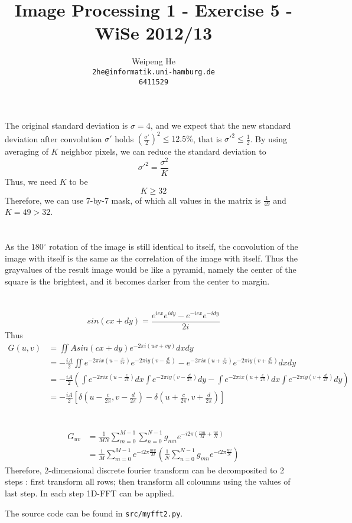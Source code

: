 \documentclass[a4paper,11pt]{article}
\title{Image Processing 1 - Exercise 5 - WiSe 2012/13}
\author{Weipeng He \\ \texttt{2he@informatik.uni-hamburg.de} \\ \texttt{6411529}}
\begin{document}
\maketitle

\section{}
The original standard deviation is $\sigma = 4$, and we expect that the new standard deviation after convolution $\sigma'$ holds $ (\frac{\sigma'}{2})^2 \le 12.5\% $, that is $ \sigma'^2 \le \frac{1}{2} $. By using averaging of $K$ neighbor pixels, we can reduce the standard deviation to
\[ \sigma'^2 = \frac{\sigma^2}{K} \]
Thus, we need $K$ to be
\[ K \ge 32 \]
Therefore, we can use 7-by-7 mask, of which all values in the matrix is $\frac{1}{49}$ and $K = 49 > 32$.

\section{}
As the $180^\circ$ rotation of the image is still identical to itself, the convolution of the image with itself is the same as the correlation of the image with itself. Thus the grayvalues of the result image would be like a pyramid, namely the center of the square is the brightest, and it becomes darker from the center to margin.

\section{}
\[ sin(cx + dy) = \frac{e^{icx}e^{idy}-e^{-icx}e^{-idy}}{2i} \]
Thus
\begin{align*}
  G(u,v) &= \iint A sin(cx+dy) e^{-2\pi i(ux+vy)}dxdy \\
         &= -\frac{iA}{2}\iint e^{-2\pi ix(u-\frac{c}{2\pi})}e^{-2\pi iy(v-\frac{d}{2\pi})}
            - e^{-2\pi ix(u+\frac{c}{2\pi})}e^{-2\pi iy(v+\frac{d}{2\pi})} dxdy \\
         &= -\frac{iA}{2} (\int e^{-2\pi ix(u-\frac{c}{2\pi})}dx \int e^{-2\pi iy(v-\frac{d}{2\pi})} dy - \int e^{-2\pi ix(u+\frac{c}{2\pi})} dx \int e^{-2\pi iy(v+\frac{d}{2\pi})}dy) \\
         &= -\frac{iA}{2} [ \delta(u-\frac{c}{2\pi}, v-\frac{d}{2\pi}) - \delta(u+\frac{c}{2\pi}, v+\frac{d}{2\pi}) ]
\end{align*}

\section{}
\begin{align*}
  G_{uv} &= \frac{1}{MN} \sum_{m=0}^{M-1}\sum_{n=0}^{N-1}g_{mn}e^{-i2\pi(\frac{mu}{M}+\frac{nv}{N})} \\
  &= \frac{1}{M} \sum_{m=0}^{M-1}e^{-i2\pi\frac{mu}{M}}(\frac{1}{N}\sum_{n=0}^{N-1}g_{mn}e^{-i2\pi\frac{nv}{N}})
\end{align*}
Therefore, 2-dimensional discrete fourier transform can be decomposited to 2 steps : first transform all rows; then transform all coloumns using the values of last step. In each step 1D-FFT can be applied.

The source code can be found in \texttt{src/myfft2.py}.
\end{document}
